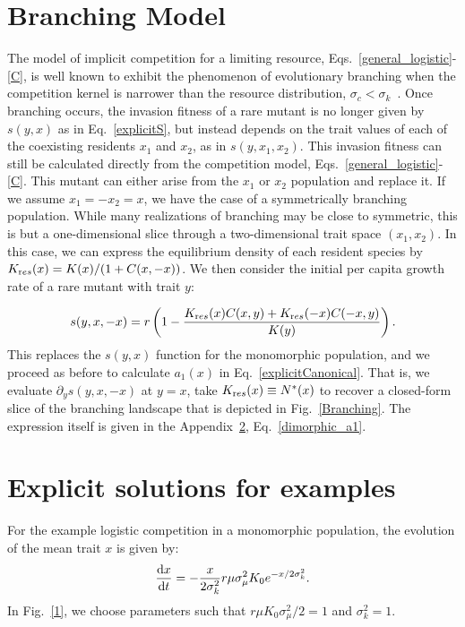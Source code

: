 \section{Branching Model}\label{BranchingModel}
The model of implicit competition for a limiting resource, Eqs.~\eqref{general_logistic}-\eqref{C}, is well known to exhibit the phenomenon of evolutionary branching when the competition kernel is narrower than the resource distribution, $\sigma_c < \sigma_k$~\citep{dieckmann_nat1999}.
Once branching occurs, the invasion fitness of a rare mutant is no longer given by $s(y,x)$ as in Eq.~\eqref{explicitS}, but instead depends on the trait values of each of the coexisting residents $x_1$ and $x_2$, as in $s(y, x_1, x_2)$. 
This invasion fitness can still be calculated directly from the competition model,  Eqs.~\eqref{general_logistic}-\eqref{C}.  This mutant can either arise from the $x_1$ or $x_2$ population and replace it.  If we assume $x_1 = -x_2 = x$, we have the case of a symmetrically branching population.  While many realizations of branching may be close to symmetric, this is but a one-dimensional slice through a two-dimensional trait space $(x_1, x_2)$.   In this case, we can express the equilibrium density of each resident species by $K_{\text res}(x) = K(x)/(1+C(x,-x) )$.  We then consider the initial per capita growth rate of a rare mutant with trait $y$:

\begin{equation}
s(y,x, -x) = r\left( 1 - \frac{K_{\text res}(x)C(x,y) + K_{\text res}(-x) C(-x, y)}{K(y)}\right).
\label{syxx}
\end{equation}
This replaces the $s(y,x)$ function for the monomorphic population, and we proceed as before to calculate $a_1(x)$ in Eq.~\eqref{explicitCanonical}.  That is, we evaluate $\partial_y s(y,x,-x)$ at $y=x$, take $K_{\text res}(x) \equiv N^{\ast}(x)$ to recover a closed-form slice of the branching landscape that is depicted in Fig.~\ref{Branching}.  The expression itself is given in the Appendix~\ref{Equations}, Eq.~\eqref{dimorphic_a1}.  


\section{Explicit solutions for examples}\label{Equations}
For the example logistic competition in a monomorphic population, the evolution of the mean trait $x$ is given by:
\begin{equation}
\frac{\mathrm{d} x}{\mathrm{d} t} = -\frac{x}{2\sigma^2_k} r \mu \sigma^2_{\mu} K_0 e^{-x/2\sigma^2_k} \label{logistic_a1}.
\end{equation}
In Fig.~\ref{1}, we choose parameters such that $r \mu K_0 \sigma_{\mu}^2 / 2  =1$ and $\sigma_k^2 = 1$.

